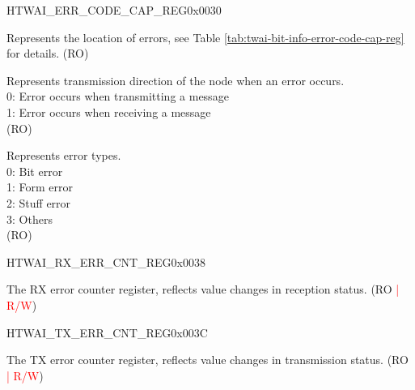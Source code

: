 \begin{register}{H}{TWAI\_ERR\_CODE\_CAP\_REG}{0x0030}\label{regdesc:TWAIERRCODECAPREG}
%
%
%
%
\regnewline%
\begin{regdesc}\begin{reglist}
\label{fielddesc:TWAIECCSEGMENT}\item [TWAI\_ECC\_SEGMENT] Represents the location of errors, see Table \ref{tab:twai-bit-info-error-code-cap-reg} for details. (RO)
\label{fielddesc:TWAIECCDIRECTION}\item [TWAI\_ECC\_DIRECTION] Represents transmission direction of the node when an error occurs.\\
0: Error occurs when transmitting a message\\
1: Error occurs when receiving a message \\
(RO)
\label{fielddesc:TWAIECCTYPE}\item [TWAI\_ECC\_TYPE] Represents error types.\\
0: Bit error\\
1: Form error\\
2: Stuff error\\
3: Others \\
(RO)
\end{reglist}\end{regdesc}
\end{register}

\begin{register}{H}{TWAI\_RX\_ERR\_CNT\_REG}{0x0038}\label{regdesc:TWAIRXERRCNTREG}
%
%
\regnewline%
\begin{regdesc}\begin{reglist}
\label{fielddesc:TWAIRXERRCNT}\item [TWAI\_RX\_ERR\_CNT] The RX error counter register, reflects value changes in reception status. (RO \textcolor{red}{| R/W})
\end{reglist}\end{regdesc}
\end{register}


\begin{register}{H}{TWAI\_TX\_ERR\_CNT\_REG}{0x003C}\label{regdesc:TWAITXERRCNTREG}
%
%
\regnewline%
\begin{regdesc}\begin{reglist}
\label{fielddesc:TWAITXERRCNT}\item [TWAI\_TX\_ERR\_CNT] The TX error counter register, reflects value changes in transmission status. (RO \textcolor{red}{| R/W})
\end{reglist}\end{regdesc}
\end{register}


